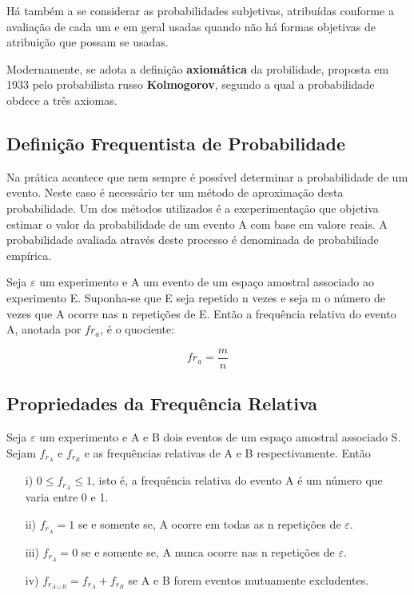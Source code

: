 \documentclass[a4paper,12pt]{report}
\begin{document}
{Há também a se considerar as probabilidades subjetivas, atribuídas
conforme a avaliação de cada um e em geral usadas quando não há
formas objetivas de atribuição que possam se usadas.\vskip0.3cm

Modernamente, se adota a definição \textbf{axiomática} da
probilidade, proposta em 1933 pelo probabilista russo
\textbf{Kolmogorov}, segundo a qual a probabilidade obdece a três
axiomas.\vskip0.3cm





\subsection{Definição Frequentista de Probabilidade}

Na prática acontece que nem sempre é possível determinar a
probabilidade de um evento. Neste caso é necessário ter um método
de aproximação desta probabilidade. Um dos métodos utilizados é a
exeperimentação que objetiva estimar o valor da probabilidade de
um evento A com base em valore reais. A probabilidade avaliada
através deste processo é denominada de probabiliade
empírica.\vskip0.3cm


Seja $\varepsilon$ um experimento e A um evento de um espaço
amostral associado ao experimento E. Suponha-se que E seja
repetido n vezes e seja m o número de vezes que A ocorre nas n
repetições de E. Então a frequência relativa do evento A, anotada
por $fr_{a}$, é o quociente:

\begin{equation}\label{}
 fr_{a}=\frac{m}{n}
\end{equation}


\subsection{Propriedades da Frequência Relativa}

Seja $\varepsilon$ um experimento e A e B dois eventos de um
espaço amostral associado S. Sejam $f_{r_{A}}$ e $f_{r_{B}}$ e as
frequências relativas de A e B respectivamente.
Então\begin{enumerate}
    \item[{i})] $0 \leq f_{r_{A}} \leq 1$, isto é, a frequência
    relativa do evento A é um número que varia entre 0 e 1.
    \item[{ii})] $f_{r_{A}}=1$ se e somente se, A ocorre em todas
    as n repetições de $\varepsilon$.
    \item[{iii})] $f_{r_{A}}=0$ se e somente se, A nunca ocorre nas n repetições de $\varepsilon$.
    \item[{iv})] $f_{r_{A \cup B}}= f_{r_{A}}+f_{r_{B}}$ se A e B
    forem eventos mutuamente excludentes.
\end{enumerate}




}
\end{document}

